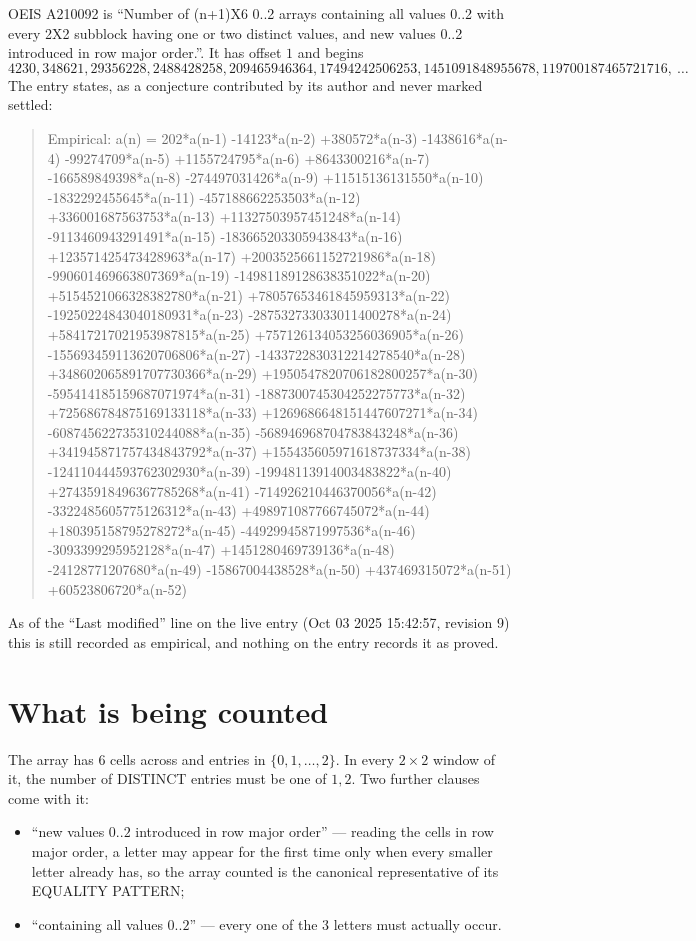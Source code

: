\documentclass[11pt,a4paper]{article}
\theoremstyle{plain}
\theoremstyle{definition}
\begin{document}
OEIS A210092 is ``Number of (n+1)X6 0..2 arrays containing all values 0..2 with every 2X2 subblock having one or two distinct values, and new values 0..2 introduced in row major order.''. It has offset $1$ and begins
\[
4230, 348621, 29356228, 2488428258, 209465946364, 17494242506253, 1451091848955678, 119700187465721716,\ \dots
\]
The entry states, as a conjecture contributed by its author and never marked settled:
\begin{quote}
Empirical: a(n) = 202*a(n-1) -14123*a(n-2) +380572*a(n-3) -1438616*a(n-4) -99274709*a(n-5) +1155724795*a(n-6) +8643300216*a(n-7) -166589849398*a(n-8) -274497031426*a(n-9) +11515136131550*a(n-10) -1832292455645*a(n-11) -457188662253503*a(n-12) +336001687563753*a(n-13) +11327503957451248*a(n-14) -9113460943291491*a(n-15) -183665203305943843*a(n-16) +123571425473428963*a(n-17) +2003525661152721986*a(n-18) -990601469663807369*a(n-19) -14981189128638351022*a(n-20) +5154521066328382780*a(n-21) +78057653461845959313*a(n-22) -19250224843040180931*a(n-23) -287532733033011400278*a(n-24) +58417217021953987815*a(n-25) +757126134053256036905*a(n-26) -155693459113620706806*a(n-27) -1433722830312214278540*a(n-28) +348602065891707730366*a(n-29) +1950547820706182800257*a(n-30) -595414185159687071974*a(n-31) -1887300745304252275773*a(n-32) +725686784875169133118*a(n-33) +1269686648151447607271*a(n-34) -608745622735310244088*a(n-35) -568946968704783843248*a(n-36) +341945871757434843792*a(n-37) +155435605971618737334*a(n-38) -124110444593762302930*a(n-39) -19948113914003483822*a(n-40) +27435918496367785268*a(n-41) -714926210446370056*a(n-42) -3322485605775126312*a(n-43) +498971087766745072*a(n-44) +180395158795278272*a(n-45) -44929945871997536*a(n-46) -3093399295952128*a(n-47) +1451280469739136*a(n-48) -24128771207680*a(n-49) -15867004438528*a(n-50) +437469315072*a(n-51) +60523806720*a(n-52)
\end{quote}
As of the ``Last modified'' line on the live entry (Oct 03 2025 15:42:57, revision 9) this is still
recorded as empirical, and nothing on the entry records it as proved.

\section{What is being counted}

The array has $6$ cells across and entries in $\{0,1,\dots,2\}$. In every
$2\times2$ window of it, the number of DISTINCT entries must be one of $1, 2$. Two
further clauses come with it:

\begin{itemize}
\item ``new values $0..2$ introduced in row major order'' --- reading the cells in row major
order, a letter may appear for the first time only when every smaller letter already has, so
the array counted is the canonical representative of its EQUALITY PATTERN;
\item ``containing all values $0..2$'' --- every one of the $3$ letters must actually
occur.
\end{itemize}
\end{document}
